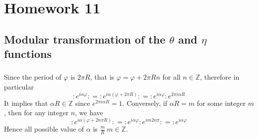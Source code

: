 \newpage
\section{Homework 11}
\subsection{Modular transformation of the $\theta$ and $\eta$ functions}
\subsubsection{}
Since the period of $\varphi$ is $2\pi R$, that is $\varphi = \varphi +  2 \pi R n$ for all $n \in \mathbb{Z}$, therefore in particular
\begin{equation}
	:e^{i\alpha \varphi}: = : e^{i \alpha (\varphi+ 2 \pi R)}: = : e^{i \alpha \varphi}: e^{2 \pi i \alpha R}
\end{equation}
It implies that $\alpha R \in \mathbb{Z}$ since $e^{2\pi i \alpha R}=1$. Conversely, if $\alpha R = m$ for some integer $m$, then for any integer $n$, we have 
\begin{equation}
	:e^{i\alpha(\varphi + 2n \pi R)}: = :e^{i \alpha \varphi}: e^{i m 2n \pi}: = :e^{i\alpha \varphi}
\end{equation}
Hence all possible value of $\alpha$ is $\frac{m}{R}\ m \in \mathbb{Z}$.
